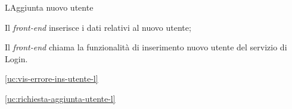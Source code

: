 \begin{usecase}{1}{L}{Aggiunta nuovo utente}



	\begin{ucscenarioprincipale}
		\item Il \textit{front-end} inserisce i dati relativi al nuovo utente;
		\item Il \textit{front-end} chiama la funzionalità di inserimento nuovo utente del servizio di Login.
	\end{ucscenarioprincipale}


	\begin{ucestensioni}
		\item \ref{uc:vis-errore-ins-utente-l}
	\end{ucestensioni}

	\begin{ucgeneralizzazioni}
		\item \ref{uc:richiesta-aggiunta-utente-l}
	\end{ucgeneralizzazioni}

	\label{uc:aggiunta-utente-l}
\end{usecase}

